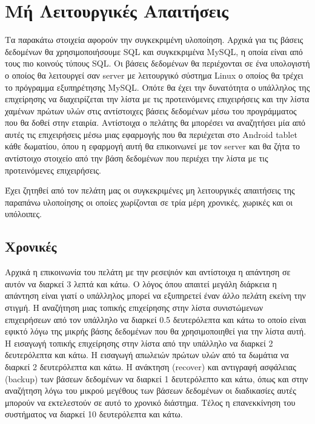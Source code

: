 \section{Μή Λειτουργικές Απαιτήσεις}
Τα παρακάτω στοιχεία αφορούν την συγκεκριμένη υλοποίηση. Αρχικά για τις βάσεις δεδομένων 
θα χρησιμοποιήσουμε SQL και συγκεκριμένα MySQL, η οποία είναι από τους πιο κοινούς 
τύπους SQL.  Οι βάσεις δεδομένων θα περιέχονται σε ένα υπολογιστή ο οποίος θα λειτουργεί 
σαν server με λειτουργικό σύστημα Linux ο οποίος θα τρέχει το πρόγραμμα εξυπηρέτησης MySQL. 
Οπότε θα έχει την δυνατότητα ο υπάλληλος της επιχείρησης να διαχειρίζεται την λίστα με τις 
προτεινόμενες επιχειρήσεις και την λίστα χαμένων πρώτων υλών στις αντίστοιχες βάσεις 
δεδομένων μέσω του προγράμματος που θα δοθεί στην εταιρία. Αντίστοιχα ο πελάτης θα 
μπορέσει να αναζητήσει μία από αυτές τις επιχειρήσεις μέσω μιας εφαρμογής που θα περιέχεται 
στο Android tablet κάθε δωματίου, όπου η εφαρμογή αυτή θα επικοινωνεί με τον server και θα ζήτα 
το αντίστοιχο στοιχείο από την βάση δεδομένων που περιέχει την λίστα με τις προτεινόμενες 
επιχειρήσεις.  

\noindent
Έχει ζητηθεί από τον πελάτη μας οι συγκεκριμένες μη λειτουργικές απαιτήσεις της παραπάνω 
υλοποίησης οι οποίες χωρίζονται σε τρία μέρη χρονικές, χωρικές και οι υπόλοιπες.

\subsection{Χρονικές}
Αρχικά η επικοινωνία του πελάτη με την ρεσεψιόν και αντίστοιχα η απάντηση σε αυτόν να 
διαρκεί 3 λεπτά και κάτω. Ο λόγος όπου απαιτεί μεγάλη διάρκεια η απάντηση είναι γιατί ο 
υπάλληλος μπορεί να εξυπηρετεί έναν άλλο πελάτη εκείνη την στιγμή. Η αναζήτηση μιας 
τοπικής επιχείρησης στην λίστα συνιστώμενων  επιχειρήσεων από τον υπάλληλο να διαρκεί 
0.5 δευτερόλεπτα και κάτω το οποίο είναι εφικτό λόγω της μικρής βάσης δεδομένων που θα 
χρησιμοποιηθεί για την λίστα αυτή. Η εισαγωγή τοπικής επιχείρησης στην λίστα από την 
υπάλληλο να διαρκεί 2 δευτερόλεπτα και κάτω.  Η εισαγωγή απωλειών πρώτων υλών από τα 
δωμάτια να διαρκεί 2 δευτερόλεπτα και κάτω. Η ανάκτηση (recover) και αντιγραφή ασφάλειας
(backup) των βάσεων δεδομένων να διαρκεί 1 δευτερόλεπτο και κάτω, όπως και στην αναζήτηση 
λόγω του μικρού μεγέθους των βάσεων δεδομένων οι διαδικασίες αυτές μπορούν να εκτελεστούν 
σε αυτό το χρονικό διάστημα. Τέλος η επανεκκίνηση του συστήματος να διαρκεί 10 
δευτερόλεπτα και κάτω.

\clearpage
